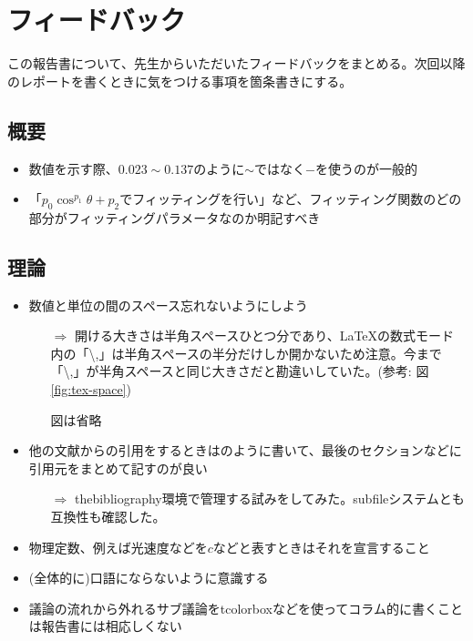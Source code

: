 \documentclass[../../main.tex]{subfiles}
\numberwithin{equation}{section}
\numberwithin{table}{section}
\numberwithin{figure}{section}
\begin{document}
\section{フィードバック}


  この報告書について、先生からいただいたフィードバックをまとめる。次回以降のレポートを書くときに気をつける事項を箇条書きにする。
  \subsection{概要}
    \begin{itemize}
      \item 数値を示す際、$0.023\sim0.137$のように$\sim$ではなく$-$を使うのが一般的
      \item 「$p_0\cos^{p_1}\theta+p_2$でフィッティングを行い」など、フィッティング関数のどの部分がフィッティングパラメータなのか明記すべき
    \end{itemize}
  \subsection{理論}
    \begin{itemize}
      \item 数値と単位の間のスペース忘れないようにしよう
      \begin{itemize}
        \item[$\Rightarrow$] 開ける大きさは半角スペースひとつ分であり、LaTeXの数式モード内の「\textbackslash,」は半角スペースの半分だけしか開かないため注意。今まで「\textbackslash,」が半角スペースと同じ大きさだと勘違いしていた。(参考: 図\ref{fig:tex-space})
        
        図は省略
      \end{itemize}
      \item 他の文献からの引用をするときは\cite{PDG:ptm}のように書いて、最後のセクションなどに引用元をまとめて記すのが良い
      \begin{itemize}
        \item[$\Rightarrow$] thebibliography環境で管理する試みをしてみた。subfileシステムとも互換性も確認した。
      \end{itemize}
      \item 物理定数、例えば光速度などを$c$などと表すときはそれを宣言すること
      \item (全体的に)口語にならないように意識する
      \item 議論の流れから外れるサブ議論をtcolorboxなどを使ってコラム的に書くことは報告書には相応しくない
    \end{itemize}
\end{document}
